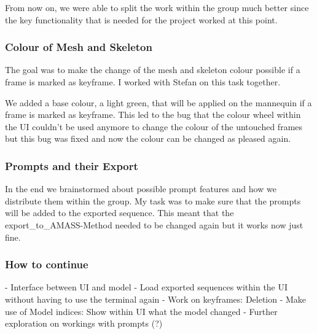 \documentclass[a4paper]{scrartcl}
\begin{document}
From now on, we were able to split the work within the group much better since the key functionality that is needed for the project worked at this point. 

\subsubsection*{Colour of Mesh and Skeleton}
The goal was to make the change of the mesh and skeleton colour possible if a frame is marked as keyframe. I worked with Stefan on this task together.

We added a base colour, a light green, that will be applied on the mannequin if a frame is marked as keyframe. This led to the bug that the colour wheel within the UI couldn't be used anymore to change the colour of the untouched frames but this bug was fixed and now the colour can be changed as pleased again.

\subsubsection*{Prompts and their Export}
In the end we brainstormed about possible prompt features and how we distribute them within the group. My task was to make sure that the prompts will be added to the exported sequence. This meant that the export\_to\_AMASS-Method needed to be changed again but it works now just fine.

\subsubsection*{How to continue}
- Interface between UI and model
- Load exported sequences within the UI without having to use the terminal again
- Work on keyframes: Deletion
- Make use of Model indices: Show within UI what the model changed 
- Further exploration on workings with prompts (?)
\end{document}
